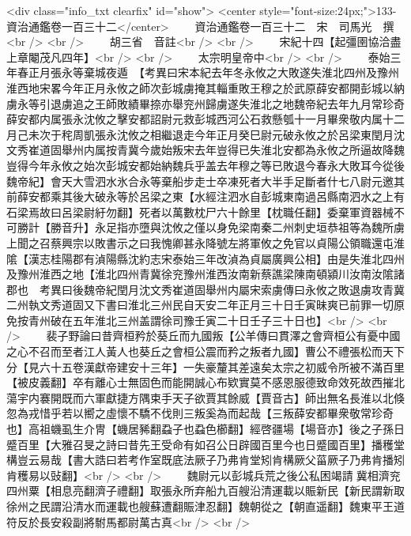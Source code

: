 <div class="info_txt clearfix" id="show">
<center style="font-size:24px;">133-資治通鑑卷一百三十二</center>
  　　資治通鑑卷一百三十二　宋　司馬光　撰<br />
<br />
　　胡三省　音註<br />
<br />
　　宋紀十四【起彊圉協洽盡上章閹茂凡四年】<br />
<br />
　　太宗明皇帝中<br />
<br />
　　泰始三年春正月張永等棄城夜遁　【考異曰宋本紀去年冬永攸之大敗遂失淮北四州及豫州淮西地宋畧今年正月永攸之師次彭城虜掩其輜重敗王穆之於武原薛安都開彭城以納虜永等引退虜追之王師敗績畢捺亦舉兖州歸虜遂失淮北之地魏帝紀去年九月常珍奇薛安都内属張永沈攸之擊安都詔尉元救彭城西河公石救懸瓠十一月畢衆敬内属十二月己未次于秺周凱張永沈攸之相繼退走今年正月癸巳尉元破永攸之於呂梁東閏月沈文秀崔道固舉州内属按青冀今歲始叛宋去年豈得已失淮北安都為永攸之所逼故降魏豈得今年永攸之始次彭城安都始納魏兵乎盖去年穆之等已敗退今春永大敗耳今從後魏帝紀】會天大雪泗水氷合永等棄船步走士卒凍死者大半手足斷者什七八尉元邀其前薛安都乘其後大破永等於呂梁之東【水經注泗水自彭城東南過呂縣南泗水之上有石梁焉故曰呂梁尉紆勿翻】死者以萬數枕尸六十餘里【枕職任翻】委棄軍資器械不可勝計【勝音升】永足指亦墮與沈攸之僅以身免梁南秦二州刺史垣恭祖等為魏所虜上聞之召蔡興宗以敗書示之曰我愧卿甚永降號左將軍攸之免官以貞陽公領職還屯淮隂【漢志桂陽郡有湞陽縣沈約志宋泰始三年改湞為貞屬廣興公相】由是失淮北四州及豫州淮西之地【淮北四州青冀徐兖豫州淮西汝南新蔡譙梁陳南頓潁川汝南汝隂諸郡也　考異曰後魏帝紀閏月沈文秀崔道固舉州内屬宋索虜傳曰永攸之敗退虜攻青冀二州執文秀道固又下書曰淮北三州民自天安二年正月三十日壬寅昧爽已前罪一切原免按青州破在五年淮北三州盖謂徐司豫壬寅二十日壬子三十日也】<br />
<br />
　　裴子野論曰昔齊桓矜於葵丘而九國叛【公羊傳曰貫澤之會齊桓公有憂中國之心不召而至者江人黃人也葵丘之會桓公震而矜之叛者九國】曹公不禮張松而天下分【見六十五卷漢獻帝建安十三年】一失豪釐其差遠矣太宗之初威令所被不滿百里【被皮義翻】卒有離心士無固色而能開誠心布欵實莫不感恩服德致命效死故西摧北蕩宇内褰開既而六軍獻捷方隅束手天子欲賈其餘威【賈音古】師出無名長淮以北倏忽為戎惜乎若以嚮之虛懷不驕不伐則三叛奚為而起哉【三叛薛安都畢衆敬常珍奇也】高祖蟣虱生介冑【蟣居豨翻蝨子也蝨色櫛翻】經啓疆場【場音亦】後之子孫日蹙百里【大雅召旻之詩曰昔先王受命有如召公日辟國百里今也日蹙國百里】播穫堂構豈云易哉【書大誥曰若考作室既底法厥子乃弗肯堂矧肯構厥父菑厥子乃弗肯播矧肯穫易以䜴翻】<br />
<br />
　　魏尉元以彭城兵荒之後公私困竭請冀相濟兖四州粟【相息亮翻濟子禮翻】取張永所弃船九百艘沿清運載以賑新民【新民謂新取徐州之民謂沿清水而運載也艘蘇遭翻賑津忍翻】魏朝從之【朝直遥翻】魏東平王道符反於長安殺副將駙馬都尉萬古真<br />
<br />
